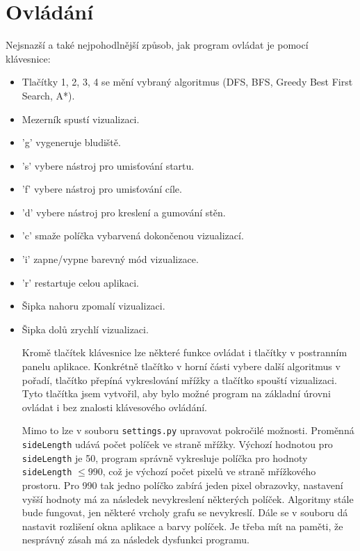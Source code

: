 \documentclass[12pt]{report}			%
\begin{document}
			\section{Ovládání}
			Nejsnazší a také nejpohodlnější způsob, jak program ovládat je pomocí klávesnice:
			\begin{itemize}
			
			\setlength\itemsep{0.01mm}
			\item Tlačítky 1, 2, 3, 4 se mění vybraný algoritmus (DFS, BFS, Greedy Best First Search, A*).
\item Mezerník spustí vizualizaci.
\item 'g' vygeneruje bludiště.
\item 's' vybere nástroj pro umisťování startu.
\item 'f' vybere nástroj pro umisťování cíle.
\item 'd' vybere nástroj pro kreslení a gumování stěn.
\item 'c' smaže políčka vybarvená dokončenou vizualizací.
\item 'i' zapne/vypne barevný mód vizualizace.
\item 'r' restartuje celou aplikaci.
\item Šipka nahoru zpomalí vizualizaci.
\item Šipka dolů zrychlí vizualizaci.

			Kromě tlačítek klávesnice lze některé funkce ovládat i tlačítky v postranním panelu aplikace. Konkrétně tlačítko v horní části vybere další algoritmus v pořadí, tlačítko  přepíná vykreslování mřížky a tlačítko  spouští vizualizaci. Tyto tlačítka jsem vytvořil, aby bylo možné program na základní úrovni ovládat i bez znalosti klávesového ovládání.
			
			
			Mimo to lze v souboru \texttt{settings.py} upravovat pokročilé možnosti. Proměnná \texttt{sideLength} udává počet políček ve straně mřížky. Výchozí hodnotou pro \texttt{sideLength} je 50, program správně vykresluje políčka pro hodnoty \texttt{sideLength} $\leq 990$, což je výchozí počet pixelů ve straně mřížkového prostoru. Pro 990 tak jedno políčko zabírá jeden pixel obrazovky, nastavení vyšší hodnoty má za následek nevykreslení některých políček. Algoritmy stále bude fungovat, jen některé vrcholy grafu se nevykreslí.
			Dále se v souboru dá nastavit rozlišení okna aplikace a barvy políček. Je třeba mít na paměti, že nesprávný zásah má za následek dysfunkci programu.
			\end{itemize}
\end{document}

